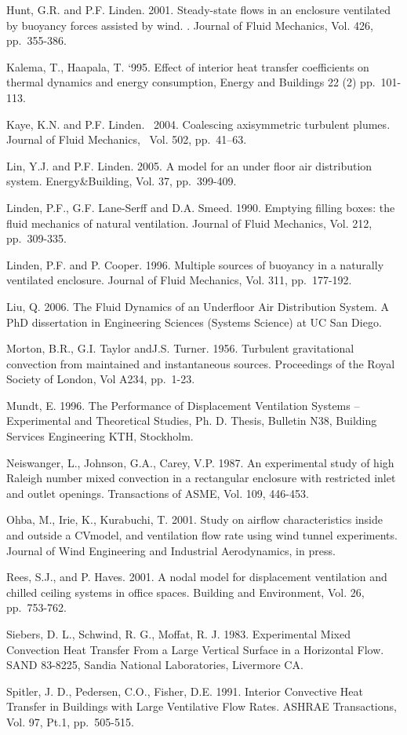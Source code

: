 Hunt, G.R. and P.F. Linden. 2001. Steady-state flows in an enclosure ventilated by buoyancy forces assisted by wind. . Journal of Fluid Mechanics, Vol. 426,~ pp.~355-386.

Kalema, T., Haapala, T. `995. Effect of interior heat transfer coefficients on thermal dynamics and energy consumption, Energy and Buildings 22 (2) pp.~101-113.

Kaye, K.N. and P.F. Linden.~ 2004. Coalescing axisymmetric turbulent plumes\emph{.} Journal of Fluid Mechanics, ~Vol. 502, pp.~41--63.

Lin, Y.J. and P.F. Linden. 2005. A model for an under floor air distribution system. Energy\&Building, Vol. 37, pp.~399-409.

Linden, P.F., G.F. Lane-Serff and D.A. Smeed. 1990. Emptying filling boxes: the fluid mechanics of natural ventilation. Journal of Fluid Mechanics, Vol. 212, pp.~309-335.

Linden, P.F. and P. Cooper. 1996. Multiple sources of buoyancy in a naturally ventilated enclosure. Journal of Fluid Mechanics, Vol. 311, pp.~177-192.

Liu, Q. 2006. The Fluid Dynamics of an Underfloor Air Distribution System. A PhD dissertation in Engineering Sciences (Systems Science) at UC San Diego.

Morton, B.R., G.I. Taylor andJ.S. Turner. 1956. Turbulent gravitational convection from maintained and instantaneous sources. Proceedings of the Royal Society of London, Vol A234, pp.~1-23.

Mundt, E. 1996. The Performance of Displacement Ventilation Systems -- Experimental and Theoretical Studies, Ph. D. Thesis, Bulletin N38, Building Services Engineering KTH, Stockholm.

Neiswanger, L., Johnson, G.A., Carey, V.P. 1987. An experimental study of high Raleigh number mixed convection in a rectangular enclosure with restricted inlet and outlet openings. Transactions of ASME, Vol. 109, 446-453.

Ohba, M., Irie, K., Kurabuchi, T. 2001. Study on airflow characteristics inside and outside a CVmodel, and ventilation flow rate using wind tunnel experiments. Journal of Wind Engineering and Industrial Aerodynamics, in press.

Rees, S.J., and P. Haves. 2001. A nodal model for displacement ventilation and chilled ceiling systems in office spaces. Building and Environment, Vol. 26, pp.~753-762.

Siebers, D. L., Schwind, R. G., Moffat, R. J. 1983. Experimental Mixed Convection Heat Transfer From a Large Vertical Surface in a Horizontal Flow. SAND 83-8225, Sandia National Laboratories, Livermore CA.

Spitler, J. D., Pedersen, C.O., Fisher, D.E. 1991. Interior Convective Heat Transfer in Buildings with Large Ventilative Flow Rates. ASHRAE Transactions, Vol. 97, Pt.1, pp.~505-515.
